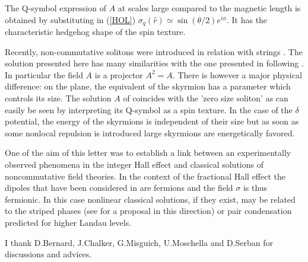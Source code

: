 \documentclass[a4paper,11pt]{article}
\begin{document}
The Q-symbol expression of $A$ at scales large compared to the magnetic length 
is obtained by substituting in (\ref{HOL}) $\sigma_q (\hat r)
\simeq \sin(\theta /2)e^{i\phi}$.
It has the characteristic hedgehog shape
of the spin texture. 

Recently, non-commutative solitons were introduced in relation with strings \cite{GOP}.
The solution presented here has many similarities with the one presented in \cite{WIT}
following \cite{MUK,HAR}.
In particular the field $A$ is a projector $A^2=A$.
There is however a major physical difference: 
on the plane, the equivalent of the skyrmion \cite{MAC} has a parameter
which controls its size.
The solution $A$ of \cite{WIT} coincides with the 'zero size soliton' as can easily be seen
by interpreting its Q-symbol as a spin texture.
In the case of the $\delta$ potential, the energy of the skyrmions
is independent of their size
but as soon as some nonlocal repulsion is introduced large skyrmions are 
energetically favored. 

One of the aim of this letter was to establish a link between an
experimentally observed phenomena in the integer Hall effect
and classical solutions of 
noncommutative field theories.
In the context of the fractional Hall effect
the dipoles that have been considered in \cite{PAHA,READ} are fermions and
the field $\sigma$ is thus fermionic. 
In this case  nonlinear classical solutions, if they exist,
may be related
to the striped phases \cite{KOU} (see \cite{SO2} for a proposal
in this direction) or pair condensation \cite{MOO}
predicted for higher Landau levels.

\smallskip
I thank D.Bernard, J.Chalker, G.Misguich, U.Moschella and D.Serban for
discussions and advices.
\end{document}

